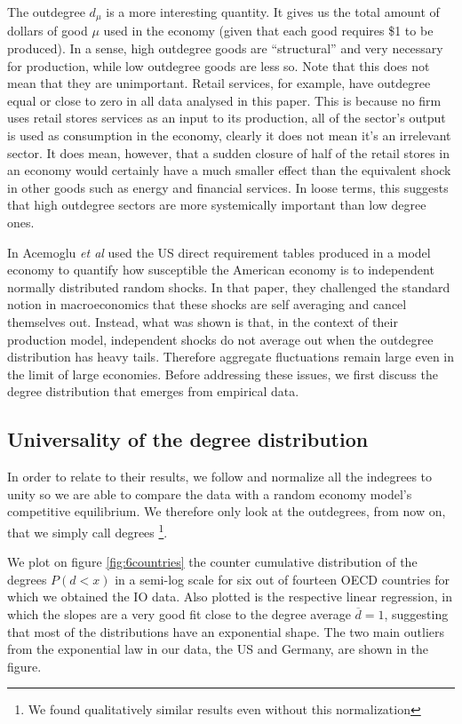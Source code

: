 The outdegree $d_\mu$ is a more interesting quantity. It gives us the
total amount of dollars of good $\mu$ used in the economy (given that
each good requires \$1 to be produced). In a sense, high outdegree
goods are ``structural'' and very necessary for production, while low
outdegree goods are less so. Note that this does not mean that they
are unimportant. Retail services, for example, have outdegree equal or
close to zero in all data analysed in this paper. This is because no firm
uses retail stores services as an input to its production, all of
the sector's output is used as consumption in the
economy, clearly it does not mean it's an irrelevant sector. It does
mean, however, that a sudden closure of half of the retail stores in
an economy would certainly have a much smaller effect than the
equivalent shock in other goods such as energy and financial
services. In loose terms, this suggests that high outdegree sectors
are more systemically important than low degree ones.

In \cite{Acemoglu12} Acemoglu \emph{et al} used the US direct requirement
tables produced in a model economy to quantify how susceptible the American
economy is to independent normally distributed random shocks. In that paper, they challenged the standard notion in macroeconomics that these shocks are self averaging and cancel themselves out. Instead, what was shown is that, in the context of their production model,
independent shocks do not average out when the outdegree distribution
has heavy tails. Therefore aggregate fluctuations remain large even in
the limit of large economies. Before addressing these issues, we
 first discuss the degree distribution that emerges from
empirical data.

\subsection{Universality of the degree distribution}

In order to relate to their results, we follow \cite{Acemoglu12} and
normalize all the indegrees to unity so we are able to compare the
data with a random economy model's competitive equilibrium. We
therefore only look at the outdegrees, from now on, that we simply call
degrees \footnote{We found qualitatively similar results even
  without this normalization}.

We plot on figure \ref{fig:6countries} the counter cumulative distribution
of the degrees $P(d < x)$ in a semi-log scale for six out of fourteen
OECD countries for which we obtained the IO data. Also plotted is the
respective linear regression, in which the slopes are a very good fit
close to the degree average $\overline{d}=1$, suggesting that most of the
distributions have an exponential shape. The two main outliers from
the exponential law in our data, the US and Germany, are shown in the
figure.

